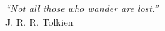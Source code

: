 
\chapter*{}
\vspace{15cm}
\begin{flushright}
	\textit	{
		“Not all those who wander are lost.”
	}\medskip\\ 
	J. R. R. Tolkien
\end{flushright}